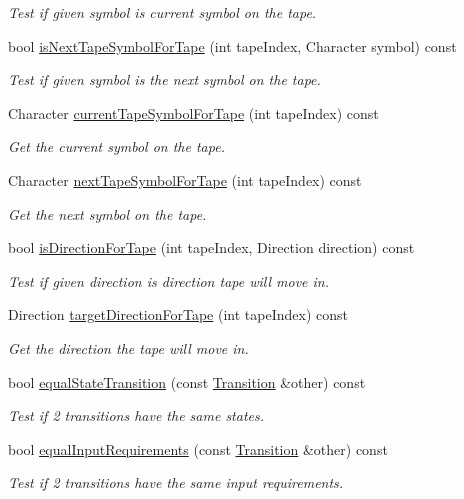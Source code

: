 \begin{DoxyCompactItemize}
\begin{DoxyCompactList}\small\item\em \-Test if given symbol is current symbol on the tape. \end{DoxyCompactList}\item 
bool \hyperlink{classtum_1_1_transition_adba735359ed2a7342433bcf4915ee45d}{is\-Next\-Tape\-Symbol\-For\-Tape} (int tape\-Index, \-Character symbol) const 
\begin{DoxyCompactList}\small\item\em \-Test if given symbol is the next symbol on the tape. \end{DoxyCompactList}\item 
\-Character \hyperlink{classtum_1_1_transition_a9832b64ebb30e9f9ae951baebbad95e3}{current\-Tape\-Symbol\-For\-Tape} (int tape\-Index) const 
\begin{DoxyCompactList}\small\item\em \-Get the current symbol on the tape. \end{DoxyCompactList}\item 
\-Character \hyperlink{classtum_1_1_transition_a53b8b9200b2f8a22c9faa9358f2725e3}{next\-Tape\-Symbol\-For\-Tape} (int tape\-Index) const 
\begin{DoxyCompactList}\small\item\em \-Get the next symbol on the tape. \end{DoxyCompactList}\item 
bool \hyperlink{classtum_1_1_transition_ace4f57aa9cbea86b4ecdd7f5ffce0229}{is\-Direction\-For\-Tape} (int tape\-Index, \-Direction direction) const 
\begin{DoxyCompactList}\small\item\em \-Test if given direction is direction tape will move in. \end{DoxyCompactList}\item 
\-Direction \hyperlink{classtum_1_1_transition_a77e8a108cfdc46da49ceee88afc1acaf}{target\-Direction\-For\-Tape} (int tape\-Index) const 
\begin{DoxyCompactList}\small\item\em \-Get the direction the tape will move in. \end{DoxyCompactList}\item 
bool \hyperlink{classtum_1_1_transition_a905647f3ad714c7cbb4723e9e349adf7}{equal\-State\-Transition} (const \hyperlink{classtum_1_1_transition}{\-Transition} \&other) const 
\begin{DoxyCompactList}\small\item\em \-Test if 2 transitions have the same states. \end{DoxyCompactList}\item 
bool \hyperlink{classtum_1_1_transition_a4790ea949ee9d5b7999f700c97f8bf8f}{equal\-Input\-Requirements} (const \hyperlink{classtum_1_1_transition}{\-Transition} \&other) const 
\begin{DoxyCompactList}\small\item\em \-Test if 2 transitions have the same input requirements. \end{DoxyCompactList}\end{DoxyCompactItemize}
